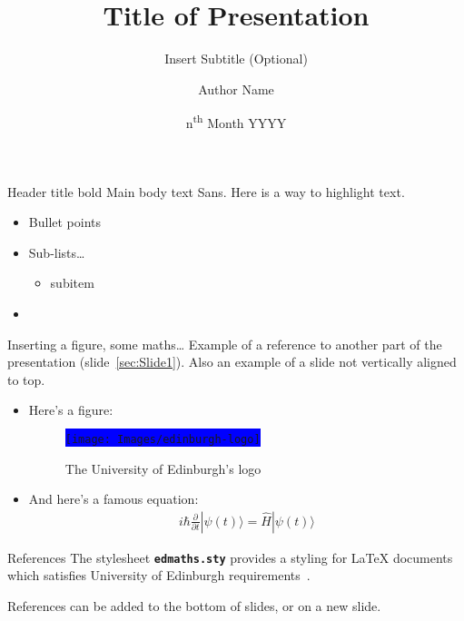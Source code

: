 \documentclass[notes]{beamer}
\title[Insert Title (short version of title)]{Title of Presentation}
\subtitle{Insert Subtitle (Optional)}  %
\author{Author Name}
\date{n\textsuperscript{th} Month YYYY}
\begin{document}
\begin{frame}
    \titlepage{}
\end{frame}


\begin{frame}[t]{Header title bold}\label{sec:Slide1}
    Main body text Sans. Here is a way to \alert{highlight text}.
    \begin{itemize}
    \item Bullet points
    \item Sub-lists\ldots
        \begin{itemize}
            \item subitem
        \end{itemize}
    \item \lipsum[2]
    \end{itemize}
\end{frame}


\begin{frame}{Inserting a figure, some maths\ldots}
    Example of a reference to another part of the presentation (slide~\ref{sec:Slide1}). Also an example of a slide not vertically aligned to top.\newline

    \begin{itemize}
        \item Here's a figure:
            \begin{figure}[h]
                \centering
                \colorbox{blue}{\texttt{[image: Images/edinburgh-logo]}}
                \caption{The University of Edinburgh's logo}\label{fig:edinburgh-logo}
            \end{figure}
        \item And here's a famous equation:
            \begin{eqnarray}
                \label{eq:schroedinger}
                i\hbar {\frac{\partial}{\partial t}}|\psi (t)\rangle ={\hat{H}}|\psi (t)\rangle
            \end{eqnarray}
    \end{itemize}
\end{frame}


\begin{frame}[t]{References}
    The stylesheet {\bf\texttt{edmaths.sty}} provides a styling for LaTeX{} documents which satisfies University of Edinburgh requirements~\cite{koeppe2007}. \newline        

    \lipsum[4]\newline

    References can be added to the bottom of slides, or on a new slide.
    \vfill 
    
    
\end{frame}
\end{document}
